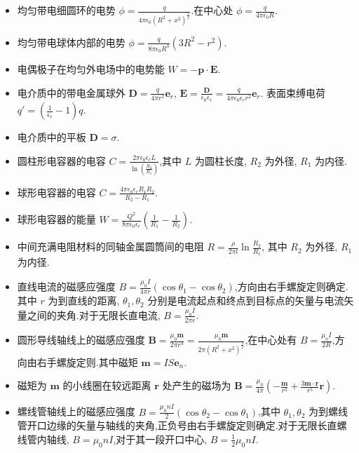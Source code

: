 \begin{itemize}
        \item 均匀带电细圆环的电势 $\phi=\frac{q}{4\pi\epsilon_0(R^2+x^2)^{\frac{1}{2}}}$.在中心处 $\phi=\frac{q}{4\pi\epsilon_0R}$.
        \item 均匀带电球体内部的电势 $\phi=\frac{q}{8\pi\epsilon_0R^3}(3R^2-r^2)$.
        \item 电偶极子在均匀外电场中的电势能 $W=-\bm{p}\cdot \bm{E}$.
        \item 电介质中的带电金属球外 $\bm{D}=\frac{q}{4\pi r^2}\bm{e}_{r}$, $\bm{E}=\frac{\bm{D}}{\epsilon_0\epsilon_{r}}=\frac{q}{4\pi\epsilon_0\epsilon_{r}r^2}\bm{e}_{r}$. 表面束缚电荷 $q'=(\frac{1}{\epsilon_{r}}-1)q$.
        \item 电介质中的平板 $\bm{D}=\sigma$.
        \item 圆柱形电容器的电容 $C=\frac{2\pi \epsilon_0\epsilon_{r}L}{\ln (\frac{R_2}{R_1})}$,其中 $L$ 为圆柱长度, $R_2$ 为外径, $R_1$ 为内径.
        \item 球形电容器的电容 $C=\frac{4\pi \epsilon_0\epsilon_{r}R_1R_2}{R_2-R_1}$.
        \item 球形电容器的能量 $W=\frac{Q^2}{8\pi \epsilon_0\epsilon_{r}}(\frac{1}{R_1}-\frac{1}{R_2})$.
        \item 中间充满电阻材料的同轴金属圆筒间的电阻 $R=\frac{\rho}{2\pi l}\ln \frac{R_2}{R_1}$, 其中 $R_2$ 为外径, $R_1$ 为内径.
        \item 直线电流的磁感应强度 $B=\frac{\mu_0I}{4\pi r}\left( \cos \theta_1 -\cos \theta_2 \right) $,方向由右手螺旋定则确定.其中 $r$ 为到直线的距离, $\theta_1,\theta_2$ 分别是电流起点和终点到目标点的矢量与电流矢量之间的夹角.对于无限长直电流, $B=\frac{\mu_0I}{2\pi r}$.
        \item 圆形导线轴线上的磁感应强度 $\bm{B}=\frac{\mu_0 \bm{m}}{2\pi r^3}=\frac{\mu_0 \bm{m}}{2\pi \left( R^2+x^2 \right) ^{\frac{3}{2}}}$,在中心处有 $B=\frac{\mu_0I}{2R}$,方向由右手螺旋定则.其中磁矩 $\bm{m}=IS \bm{e}_{n}$.
        \item 磁矩为 $\bm{m}$ 的小线圈在较远距离 $\bm{r}$ 处产生的磁场为 $\bm{B}=\frac{\mu_0}{4\pi}\left( -\frac{\bm{m}}{r^3}+\frac{3 \bm{m}\cdot \bm{r}}{r^{5}}\bm{r} \right) $.
        \item 螺线管轴线上的磁感应强度 $B=\frac{\mu_0nI}{2}\left( \cos\theta_2-\cos\theta_1 \right) $,其中 $\theta_1,\theta_2$ 为到螺线管开口边缘的矢量与轴线的夹角,正负号由右手螺旋定则确定.对于无限长直螺线管内轴线, $B=\mu_0nI$,对于其一段开口中心, $B=\frac{1}{2}\mu_0nI$.

\end{itemize}
